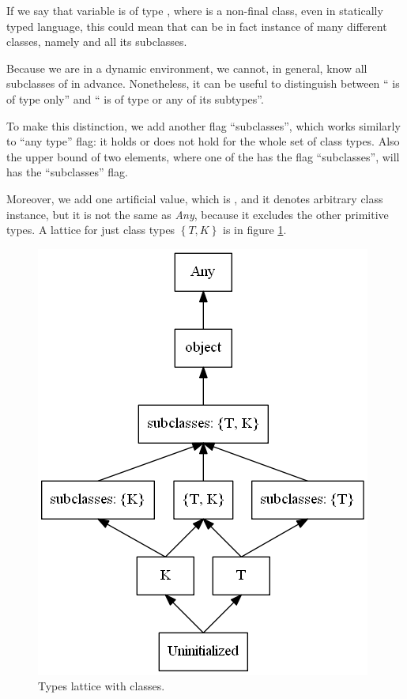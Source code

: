         If we say that variable  is of type , 
        where  is a non-final class, even in statically 
        typed language, this could mean that  can 
        be in fact instance of many different classes, 
        namely  and all its subclasses.
        
        Because we are in a dynamic environment, we cannot, 
        in general, know all subclasses of  in advance. 
        Nonetheless, it can be useful to distinguish between 
        `` is of type  only'' and 
        `` is of type  or any of its subtypes''.
        
        To make this distinction, we add another flag ``subclasses'', 
        which works similarly to ``any type'' flag: it holds or does 
        not hold for the whole set of class types. Also the upper bound 
        of two elements, where one of the has the flag ``subclasses'', 
        will has the ``subclasses'' flag.
        
        Moreover, we add one artificial value, which is , 
        and it denotes arbitrary class instance, but it is not the 
        same as \emph{Any}, because it excludes the other primitive 
        types. A lattice for just class types $\left\{T,K\right\}$ 
        is in figure \ref{objectslattice}.
        
        \begin{figure}[h]  
          \centering        
          \includegraphics[scale=0.5]{graphs/objects.png}
          \caption{Types lattice with classes.\label{objectslattice}}    
        \end{figure}        
        
